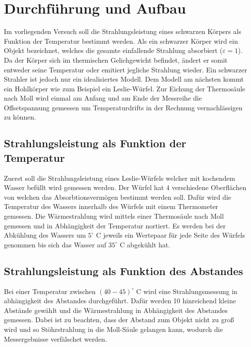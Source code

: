 \section{Durchführung und Aufbau}
\label{sec:Durchführung}
Im vorliegenden Versuch soll die Strahlungsleistung eines schwarzen Körpers als Funktion der Temperatur bestimmt werden. Als ein schwarzer Körper wird ein Objekt bezeichnet, welches die gesamte einfallende Strahlung absorbiert ($\varepsilon = 1$). Da der Körper sich im thermischen Gelichgewicht befindet, ändert er somit entweder seine Temperatur oder emitiert jegliche Strahlung wieder. Ein schwarzer Strahler ist jedoch nur ein idealisiertes Modell. Dem Modell am nächsten kommt ein Hohlkörper wie zum Beispiel ein Leslie-Würfel. Zur Eichung der Thermosäule nach Moll wird einmal am Anfang und am Ende der Messreihe die Offsetspannung gemessen um Temperaturdrifts in der Rechnung vernachlässigen zu können.
\subsection{Strahlungsleistung als Funktion der Temperatur}
Zuerst soll die Strahlungsleistung eines Leslie-Würfels welcher mit kochendem Wasser befüllt wird gemessen werden. Der Würfel hat 4 verschiedene Oberflächen von welchen das Absorbtionsvermögen bestimmt werden soll. Dafür wird die Temperatur des Wassers innerhalb des Würfels mit einem Thermometer gemessen. Die Wärmestrahlung wird mittels einer Thermosäule nach Moll gemessen und in Abhängigkeit der Temperatur nortiert. Es werden bei der Abkühlung des Wassers um $5^\circ$ C jeweils ein Wertepaar für jede Seite des Würfels genommen bis sich das Wasser auf $35^\circ$ C abgekühlt hat.
\subsection{Strahlungsleistung als Funktion des Abstandes}
Bei einer Temperatur zwischen $(40 - 45) ^\circ$ C wird eine Strahlungsmessung in abhängigkeit des Abstandes durchgeführt. Dafür werden 10 hinreichend kleine Abstände gewählt und die Wärmestrahlung in Abhängigkeit des Abstandes gemessen. Dabei ist zu beachten, dass der Abstand zum Objekt nicht zu groß wird und so Stöhrstrahlung in die Moll-Säule gelangen kann, wodurch die Messergebnisse verfälschet werden.
